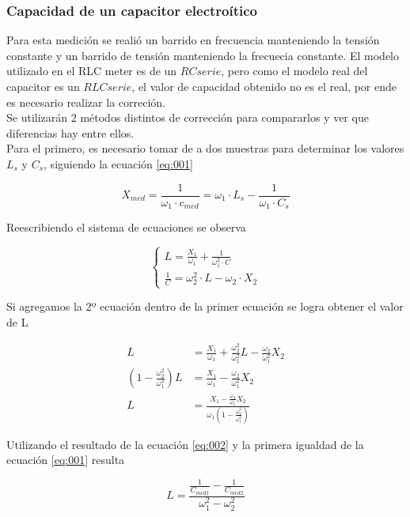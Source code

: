 \documentclass[a4paper,10pt]{article}
\begin{document}
		\subsubsection{Capacidad de un capacitor electro\'itico}	
		\indent Para esta medición se realió un barrido en frecuencia 
		manteniendo la tensión constante y un barrido de tensión manteniendo la
		frecuecia constante. El modelo utilizado en el RLC meter es de un $RC 
		serie$, pero como el modelo real del capacitor es un $RLC serie$, el 
		valor de capacidad obtenido no es el real, por ende es necesario 
		realizar la correción. \\
		\indent Se utilizarán 2 métodos distintos de corrección para compararlos
		y ver que diferencias hay entre ellos. \\
		\indent Para el primero, es necesario tomar de a dos muestras para 
		determinar los valores $L_s$ y $C_s$, siguiendo la ecuación \ref{eq:001}
		
		\begin{equation}\label{eq:001}
			X_{med} = \frac{1}{\omega_1\cdot c_{med}} = \omega_1\cdot L_s - 
			\frac{1}{\omega_1\cdot C_s}
		\end{equation}
		
		\indent Reescribiendo el sistema de ecuaciones se observa
		
		\[
		\begin{cases} 
			L = \frac{X_1}{\omega_1} + \frac{1}{\omega_1^2\cdot C} \\ 
			\frac{1}{C} = \omega_2^2\cdot L - \omega_2\cdot X_2
		\end{cases}
		\]
		
		\indent Si agregamos la 2º ecuación dentro de la primer ecuación 
		se logra obtener el valor de L

		\begin{align}\label{eq:002}
			L &= \frac{X_1}{\omega_1} + \frac{\omega_2^2}{\omega_1^2}L 
				- \frac{\omega_2}{\omega_1^2}X_2 \nonumber \\ 
			(1 - \frac{\omega_2^2}{\omega_1^2})L &= \frac{X_1}{\omega_1}
				- \frac{\omega_2}{\omega_1^2}X_2 \nonumber \\
			L &= \frac{X_1 - \frac{\omega_2}{\omega_1}X_2}
				{\omega_1(1 - \frac{\omega_2^2}{\omega_1^2})}
		\end{align}

		\indent Utilizando el resultado de la ecuación \ref{eq:002} y la primera
		igualdad de la ecuación \ref{eq:001} resulta

		\begin{equation}\label{eq:003}
			L = \frac{\frac{1}{C_{med1}} - \frac{1}{C_{med2}}}
					{\omega_1^2 - \omega_2^2}
		\end{equation}
\end{document}
